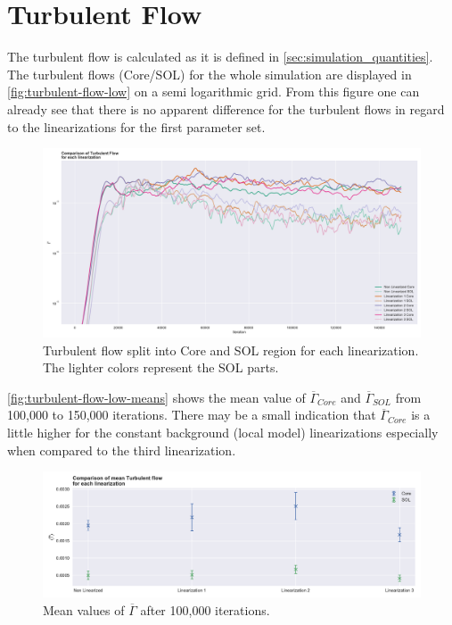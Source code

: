 \documentclass[master.tex]{subfiles}
\newcommand{\Tflow}[0]{\overline{\Gamma}}
\begin{document}
\section{Turbulent Flow}
The turbulent flow is calculated as it is defined in \autoref{sec:simulation_quantities}. The turbulent flows (Core/\ac{SOL}) for the whole simulation are displayed in \autoref{fig:turbulent-flow-low} on a semi logarithmic grid. From this figure one can already see that there is no apparent difference for the turbulent flows in regard to the linearizations for the first parameter set.
\begin{figure}[!htbp]
    \includegraphics[width=\linewidth]{pdfs/0-2_0-64/turbulent-flow-time.pdf}
    \caption{Turbulent flow split into Core and \ac{SOL} region for each linearization. The lighter colors represent the \ac{SOL} parts.}
    \label{fig:turbulent-flow-low}
\end{figure}
\autoref{fig:turbulent-flow-low-means} shows the mean value of $\Tflow_{Core}$ and $\Tflow_{SOL}$ from 100,000 to 150,000 iterations. There may be a small indication that $\Tflow_{Core}$ is a little higher for the constant background (local model) linearizations especially when compared to the third linearization. 



\begin{figure}[!htbp]
    \includegraphics[width=\linewidth]{pdfs/0-2_0-64/turbulent-flows-mean-100000.pdf}
    \caption{Mean values of $\Tflow$ after 100,000 iterations.}
    \label{fig:turbulent-flow-low-means}
\end{figure}
\end{document}
